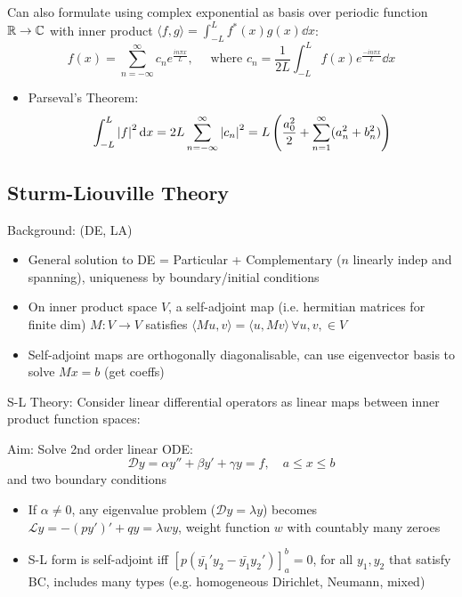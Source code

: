 Can also formulate using complex exponential as basis over periodic function $\mathbb{R} \to \mathbb{C}$ with inner product $\langle f,g \rangle = \int_{-L}^{L} f^*(x) g(x) \dd{x} $:
\[f(x) = \sum_{n=-\infty}^\infty c_n e^{\frac{i n \pi x}{L}}, \quad \text{ where } c_n = \frac{1}{2L}\int_{-L}^{L} f(x) e^{\frac{-i n \pi x}{L}} \dd{x}\]

\begin{itemize}
    \item Parseval's Theorem: \[\int_{-L}^L \left| f \right|^2 \mathrm{d} x = 2L \sum_{n=-\infty}^\infty \left| c_n \right|^2 = L \left( \frac{a_0^2}{2} + \sum_{n=1}^\infty (a_n^2+b_n^2) \right)\]
\end{itemize}

\subsection*{Sturm-Liouville Theory}
Background: (DE, LA)
\begin{itemize}
    \item General solution to DE = Particular + Complementary ($n$ linearly indep and spanning), uniqueness by boundary/initial conditions
    \item On inner product space $V$, a self-adjoint map (i.e. hermitian matrices for finite dim) $M:V \to V$ satisfies $\langle Mu,v\rangle = \langle u, Mv \rangle \, \forall u,v, \in V$
    \item Self-adjoint maps are orthogonally diagonalisable, can use eigenvector basis to solve $Mx=b$ (get coeffs)
\end{itemize}

S-L Theory: Consider linear differential operators as linear maps between inner product function spaces:

Aim: Solve 2nd order linear ODE: \[\mathcal{D}y = \alpha y''+\beta y' + \gamma y = f, \quad a \leq x \leq b\] and two boundary conditions

\begin{itemize}
    \item If $\alpha \neq 0$, any eigenvalue problem ($\mathcal{D}y = \lambda y$) becomes $\mathcal{L}y = -(py')'+qy = \lambda wy$, weight function $w$ with countably many zeroes
    \item S-L form is self-adjoint iff $ \left[ p\left( \bar{y_1}' y_2 - \bar{y_1}y_2'\right) \right]_a^b = 0$, for all $y_1, y_2$ that satisfy BC, includes many types (e.g. homogeneous Dirichlet, Neumann, mixed)
\end{itemize}

